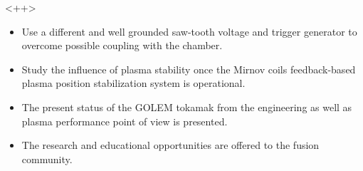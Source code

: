 \documentclass[portrait,final,a0paper]{baposter}
\def\bi{\begin{itemize}}
\def\ei{\end{itemize}}
\def\im{\item}
\begin{document}
\begin{poster}
 {
 }<++>
{
\begin{itemize}
    \item Use a different and well grounded saw-tooth voltage and trigger generator to overcome possible coupling with the chamber.
    \item Study the influence of plasma stability once the Mirnov coils feedback-based plasma position stabilization system is operational.
\end{itemize}
}
{
  \bi
    \im The present status of the GOLEM tokamak from the engineering as well as plasma performance point of view is presented.
    \im The research and educational opportunities are offered to the fusion community.
  \ei
}


{
  \nocite{FusenEngDes11}
  \nocite{Zara06}
    \smaller
    \vspace{-0.4em}
    
    \renewcommand{\section}[2]{\vskip 0.05em}
    
}

\end{poster}
\end{document}
